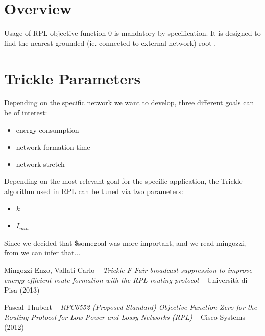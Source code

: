 \documentclass[a4paper,12pt]{article}
\begin{document}
\section{Overview}
Usage of RPL objective function 0 is mandatory by specification.
It is designed to find the nearest grounded (ie. connected to external network) root \cite{rfc:rplof0}.

\section{Trickle Parameters}
Depending on the specific network we want to develop, three different goals can be of interest:
\begin{itemize}
  \item energy consumption
  \item network formation time
  \item network stretch
\end{itemize}

Depending on the most relevant goal for the specific application, the Trickle algorithm used in RPL can be tuned via two parameters:
\begin{itemize}
  \item $k$
  \item $I_{min}$
\end{itemize}

Since we decided that \$somegoal was more important, and we read mingozzi, %
from \cite{bib:mingozzi:tricklef} we can infer that... %


\begin{thebibliography}{9}

  Mingozzi Enzo, Vallati Carlo --
  \emph{Trickle-F Fair broadcast suppression to improve energy-efficient route formation with the RPL routing protocol} --
  Università di Pisa
  (2013)

  Pascal Thubert --
  \emph{RFC6552 (Proposed Standard) Objective Function Zero for the Routing Protocol for Low-Power and Lossy Networks (RPL)} --
  Cisco Systems
  (2012)


\end{thebibliography}
\end{document}
